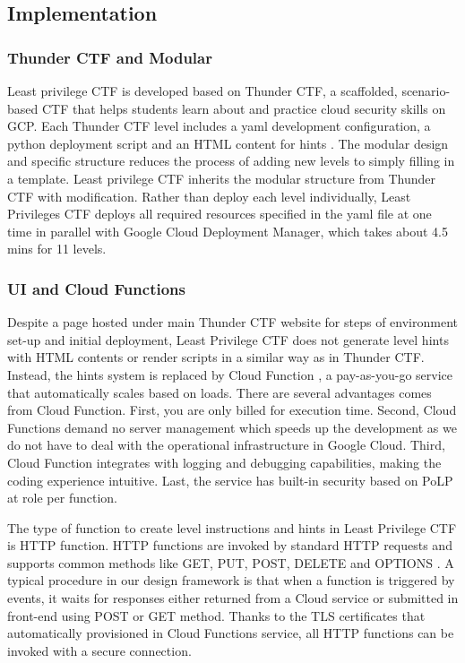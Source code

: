 \documentclass[a4paper,twoside]{article}
\begin{document}
\subsection{Implementation}

\subsubsection{Thunder CTF and Modular}
Least privilege CTF is developed based on Thunder CTF, a scaffolded, scenario-based CTF that helps students learn about and practice cloud security skills on GCP. Each Thunder CTF level includes a yaml development configuration, a python deployment script and an HTML content for hints \cite{Springer}. The modular design and specific structure reduces the process of adding new levels to simply filling in a template. Least privilege CTF inherits the modular structure from Thunder CTF with modification. Rather than deploy each level individually, Least Privileges CTF deploys all required resources specified in the yaml file at one time in parallel with Google Cloud Deployment Manager, which takes about 4.5 mins for 11 levels.

\subsubsection{UI and Cloud Functions}
Despite a page \cite{lst-ctf} hosted under main Thunder CTF website for steps of environment set-up and initial deployment, Least Privilege CTF does not generate level hints with HTML contents or render scripts in a similar way as in Thunder CTF. Instead, the hints system is replaced by Cloud Function \cite{cloudfunc}, a pay-as-you-go service that automatically scales based on loads. There are several advantages comes from Cloud Function. First, you are only billed for execution time. Second, Cloud Functions demand no server management which speeds up the development as we do not have to deal with the operational infrastructure in Google Cloud. Third, Cloud Function integrates with logging and debugging capabilities, making the coding experience intuitive. Last, the service has built-in security based on PoLP at role per function. 

The type of function to create level instructions and hints in Least Privilege CTF is HTTP function. HTTP functions are invoked by standard HTTP requests and supports common methods like GET, PUT, POST, DELETE and OPTIONS \cite{httpfunc}. A typical procedure in our design framework is that when a function is triggered by events, it waits for responses either returned from a Cloud service or submitted in front-end using POST or GET method. Thanks to the TLS certificates that automatically provisioned in Cloud Functions service, all HTTP functions can be invoked with a secure connection. 
\end{document}
